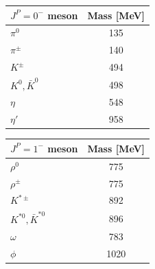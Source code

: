 \documentclass[11pt]{article}
\begin{document}
\begin{center}
  \begin{tabular}{l|c}
   $J^P = 0^-$ meson & Mass [MeV]\\ \hline
   $\pi^0$ & 135 \\
   $\pi^\pm$ & 140 \\
   $K^\pm$ & 494 \\
   $K^0,\bar K^0$ & 498 \\
   $\eta$ & 548 \\
   $\eta'$ & 958 \\
  \end{tabular}\quad
  \begin{tabular}{l|c}
   $J^P = 1^-$ meson & Mass [MeV]\\ \hline
   $\rho^0$ & 775 \\
   $\rho^\pm$ & 775 \\
   $K^{*\pm}$ & 892 \\
   $K^{*0},\bar K^{*0}$ & 896 \\
   $\omega$ & 783 \\
   $\phi$ & 1020 \\
  \end{tabular}
\end{center}  
\end{document}
